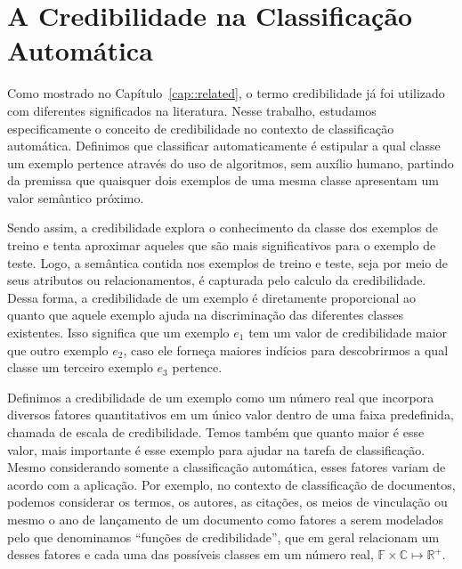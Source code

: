 \chapter{A Credibilidade na Classificação Automática} 
\label{cap::metodo}

Como mostrado no Capítulo~\ref{cap::related}, o termo credibilidade já foi utilizado com diferentes significados na literatura. Nesse trabalho, estudamos especificamente o conceito de credibilidade no contexto de classificação automática. Definimos que classificar automaticamente é estipular a qual classe um exemplo pertence através do uso de algoritmos, sem auxílio humano, partindo da premissa que quaisquer dois exemplos de uma mesma classe apresentam um valor semântico próximo.   

Sendo assim, a credibilidade explora o conhecimento da classe dos exemplos de treino e tenta aproximar aqueles que são mais significativos para o exemplo de teste.
Logo, a semântica contida nos exemplos de treino e teste, seja por meio de seus atributos ou relacionamentos, é capturada pelo calculo da credibilidade.
Dessa forma, a credibilidade de um exemplo é diretamente proporcional ao quanto que aquele exemplo ajuda na discriminação das diferentes classes existentes.
Isso significa que um exemplo $e_{1}$ tem um valor de credibilidade maior que outro exemplo $e_{2}$, caso ele forneça maiores indícios para descobrirmos a qual classe um terceiro exemplo $e_{3}$ pertence. 

Definimos a credibilidade de um exemplo como um número real que incorpora diversos fatores quantitativos em um único valor dentro de uma faixa predefinida, chamada de escala de credibilidade. Temos também que quanto maior é esse valor, mais importante é esse exemplo para ajudar na tarefa de classificação. Mesmo considerando somente a classificação automática, esses fatores variam de acordo com a aplicação. Por exemplo, no contexto de classificação de documentos, podemos considerar os termos, os autores, as citações, os meios de vinculação ou mesmo o ano de lançamento de um documento como fatores a serem modelados pelo que denominamos ``funções de credibilidade'', que em geral relacionam um desses fatores e cada uma das possíveis classes em um número real, $\mathbb{F} \times \mathbb{C} \mapsto \mathbb{R}^+$. 


